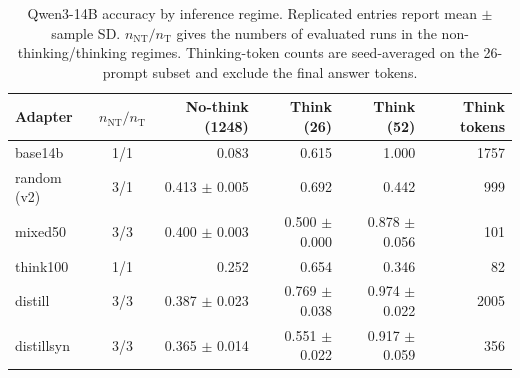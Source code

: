 \begin{table}[t]
\caption{Qwen3-14B accuracy by inference regime. Replicated entries report mean $\pm$ sample SD. $n_{\mathrm{NT}}/n_{\mathrm{T}}$ gives the numbers of evaluated runs in the non-thinking/thinking regimes. Thinking-token counts are seed-averaged on the 26-prompt subset and exclude the final answer tokens.}\label{t:regimes}
\centering\small
\setlength{\tabcolsep}{4pt}
\begin{tabular}{lcrrrr}
\toprule
Adapter & $n_{\mathrm{NT}}/n_{\mathrm{T}}$ & No-think (1248) & Think (26) & Think (52) & Think tokens\\\midrule
base14b & 1/1 & 0.083 & 0.615 & 1.000 & 1757\\
random (v2) & 3/1 & 0.413 $\pm$ 0.005 & 0.692 & 0.442 & 999\\
mixed50 & 3/3 & 0.400 $\pm$ 0.003 & 0.500 $\pm$ 0.000 & 0.878 $\pm$ 0.056 & 101\\
think100 & 1/1 & 0.252 & 0.654 & 0.346 & 82\\
distill & 3/3 & 0.387 $\pm$ 0.023 & 0.769 $\pm$ 0.038 & 0.974 $\pm$ 0.022 & 2005\\
distillsyn & 3/3 & 0.365 $\pm$ 0.014 & 0.551 $\pm$ 0.022 & 0.917 $\pm$ 0.059 & 356\\
\bottomrule
\end{tabular}
\end{table}
